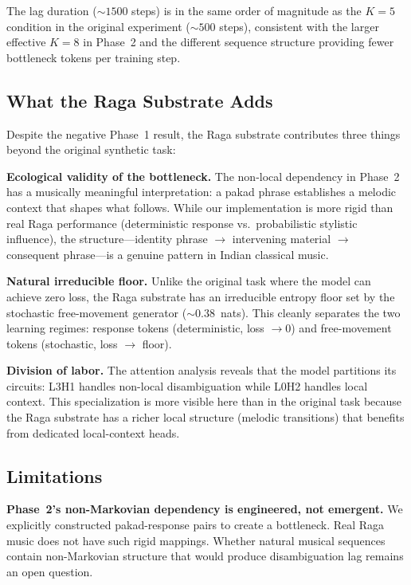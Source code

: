 \documentclass[11pt,a4paper]{article}
\begin{document}
The lag duration (${\sim}1500$ steps) is in the same order of magnitude as the $K = 5$ condition in the original experiment (${\sim}500$ steps), consistent with the larger effective $K = 8$ in Phase~2 and the different sequence structure providing fewer bottleneck tokens per training step.

\subsection{What the Raga Substrate Adds}

Despite the negative Phase~1 result, the Raga substrate contributes three things beyond the original synthetic task:

\textbf{Ecological validity of the bottleneck.} The non-local dependency in Phase~2 has a musically meaningful interpretation: a pakad phrase establishes a melodic context that shapes what follows. While our implementation is more rigid than real Raga performance (deterministic response vs.\ probabilistic stylistic influence), the structure---identity phrase $\to$ intervening material $\to$ consequent phrase---is a genuine pattern in Indian classical music.

\textbf{Natural irreducible floor.} Unlike the original task where the model can achieve zero loss, the Raga substrate has an irreducible entropy floor set by the stochastic free-movement generator (${\sim}0.38$~nats). This cleanly separates the two learning regimes: response tokens (deterministic, loss $\to 0$) and free-movement tokens (stochastic, loss $\to$ floor).

\textbf{Division of labor.} The attention analysis reveals that the model partitions its circuits: L3H1 handles non-local disambiguation while L0H2 handles local context. This specialization is more visible here than in the original task because the Raga substrate has a richer local structure (melodic transitions) that benefits from dedicated local-context heads.

\subsection{Limitations}

\textbf{Phase~2's non-Markovian dependency is engineered, not emergent.} We explicitly constructed pakad-response pairs to create a bottleneck. Real Raga music does not have such rigid mappings. Whether natural musical sequences contain non-Markovian structure that would produce disambiguation lag remains an open question.
\end{document}
